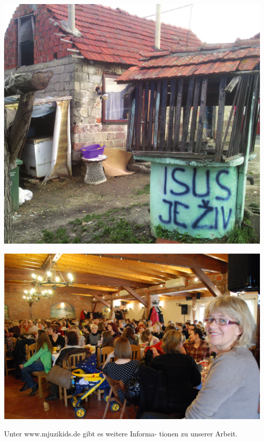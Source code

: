 \documentclass[a4paper,twoside, svgnames]{article}
\begin{document}
\begin{multicols}{2}
\begin{onehalfspacing}
\begin{justify}
\begin{center}
\includegraphics[width=\linewidth]{images/cigo}
\end{center}

\begin{center}
\includegraphics[width=\linewidth]{images/dorucakzazene}
\end{center}

Unter www.mjuzikids.de gibt es weitere Informa-
tionen zu unserer Arbeit.


\end{justify}
\end{onehalfspacing}
\end{multicols}
\end{document}
